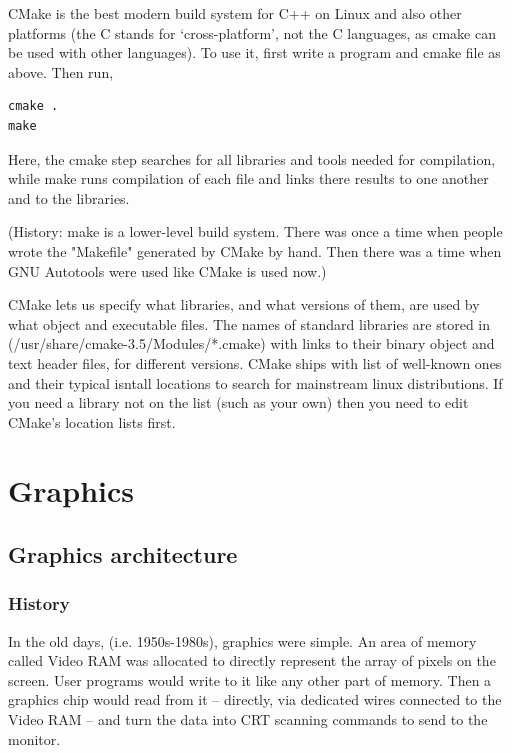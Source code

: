 \documentclass[oneside,english]{scrbook}
\begin{document}



CMake is the best modern build system for C++ on Linux and also other platforms (the C stands for `cross-platform', not the C languages, as cmake can be used with other languages).  To use it, first write a program and cmake file as above. Then run,
\begin{lstlisting}
cmake .
make
\end{lstlisting}

Here, the cmake step searches for all libraries and tools needed for compilation, while make runs compilation of each file and links there results to one another and to the libraries.

(History: make is a lower-level build system. There was once a time when people wrote the "Makefile" generated by CMake by hand.  Then there was a time when GNU Autotools were used like CMake is used now.)

CMake lets us specify what libraries, and what versions of them,  are used by what object and executable files.  The names of standard libraries are stored in (/usr/share/cmake-3.5/Modules/*.cmake) with links to their binary object and text header files, for different versions.  CMake ships with list of well-known ones and their typical isntall locations to search for mainstream linux distributions. If you need a library not on the list (such as your own) then you need to edit CMake's location lists first.
\part{Graphics}


\chapter{Graphics architecture}

\section{History}

In the old days, (i.e. 1950s-1980s), graphics were simple.  An area of memory called Video RAM was allocated to directly represent the array of pixels on the screen.   User programs would write to it like any other part of memory. Then a graphics chip would read from it -- directly, via dedicated wires connected to the Video RAM -- and turn the data into CRT scanning commands to send to the monitor.
\end{document}
